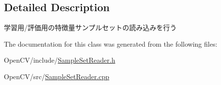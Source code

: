 \subsection{Detailed Description}
学習用/評価用の特徴量サンプルセットの読み込みを行う 

The documentation for this class was generated from the following files\+:\begin{DoxyCompactItemize}
\item 
Open\+C\+V/include/\hyperlink{_sample_set_reader_8h}{Sample\+Set\+Reader.\+h}\item 
Open\+C\+V/src/\hyperlink{_sample_set_reader_8cpp}{Sample\+Set\+Reader.\+cpp}\end{DoxyCompactItemize}
